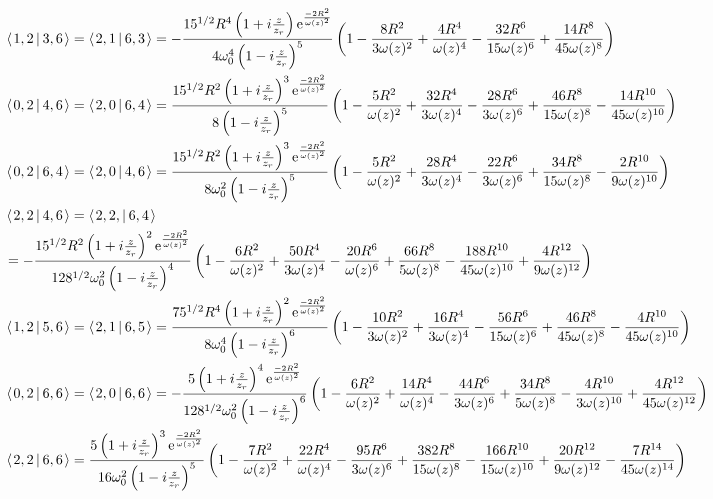 \documentclass[11pt]{amsart}
\makeatletter
\newcommand{\e}{{\rm e}}				%
\newcommand{\msp}[1]{\mspace{#1mu}}		%
\newcommand{\0}{\varnothing}		%
\newcommand{\brac}[2]{\left\langle\msp{2} #1\left\lvert \msp{3.5} #2 \right.\right\rangle}	%
\newcommand{\1}{!}
\newcommand{\2}{@}
\newcommand{\3}{\#}
\newcommand{\4}{\$}
\newcommand{\5}{\%}
\newcommand{\6}{$^\wedge$}
\newcommand{\7}{\&}
\newcommand{\8}{*}
\newcommand{\9}{(}
\makeatother
\begin{document}
\begin{align*}
&
\brac{1,2}{3,6}=\brac{2,1}{6,3} = -\frac{15^{1/2}R^4\left(1+i\frac{z}{z_r}\right)\e^{\frac{-2R^2}{\omega(z)^2}}}{4\omega_0^4\left(1-i\frac{z}{z_r}\right)^5}\left(1-\frac{8R^2}{3\omega(z)^2}+\frac{4R^4}{\omega(z)^4}-\frac{32R^6}{15\omega(z)^6}+\frac{14R^8}{45\omega(z)^8}\right)
\\
&
\brac{0,2}{4,6}=\brac{2,0}{6,4} = \frac{15^{1/2}R^2\left(1+i\frac{z}{z_r}\right)^3\e^{\frac{-2R^2}{\omega(z)^2}}}{8\left(1-i\frac{z}{z_r}\right)^5}\left(1-\frac{5R^2}{\omega(z)^2}+\frac{32R^4}{3\omega(z)^4}-\frac{28R^6}{3\omega(z)^6}+\frac{46R^8}{15\omega(z)^8}-\frac{14R^{10}}{45\omega(z)^{10}}\right)
\\
&
\brac{0,2}{6,4} = \brac{2,0}{4,6} = \frac{15^{1/2}R^2\left(1+i\frac{z}{z_r}\right)^3\e^{\frac{-2R^2}{\omega(z)^2}}}{8\omega_0^2\left(1-i\frac{z}{z_r}\right)^5}\left(1-\frac{5R^2}{\omega(z)^2}+\frac{28R^4}{3\omega(z)^4}-\frac{22R^6}{3\omega(z)^6}+\frac{34R^8}{15\omega(z)^8}-\frac{2R^{10}}{9\omega(z)^{10}}\right)
\\
&
\brac{2,2}{4,6} = \brac{2,2,}{6,4} 
\\
&
= -\frac{15^{1/2}R^2\left(1+i\frac{z}{z_r}\right)^2\e^{\frac{-2R^2}{\omega(z)^2}}}{128^{1/2}\omega_0^2\left(1-i\frac{z}{z_r}\right)^4}\left(1-\frac{6R^2}{\omega(z)^2}+\frac{50R^4}{3\omega(z)^4}-\frac{20R^6}{\omega(z)^6}+\frac{66R^8}{5\omega(z)^8}-\frac{188R^{10}}{45\omega(z)^{10}}+\frac{4R^{12}}{9\omega(z)^{12}}\right)
\\
&
\brac{1,2}{5,6}=\brac{2,1}{6,5}=\frac{75^{1/2}R^4\left(1+i\frac{z}{z_r}\right)^2\e^{\frac{-2R^2}{\omega(z)^2}}}{8\omega_0^4\left(1-i\frac{z}{z_r}\right)^6}\left(1-\frac{10R^2}{3\omega(z)^2}+\frac{16R^4}{3\omega(z)^4}-\frac{56R^6}{15\omega(z)^6}+\frac{46R^8}{45\omega(z)^8}-\frac{4R^{10}}{45\omega(z)^{10}}\right)
\\
&
\brac{0,2}{6,6} = \brac{2,0}{6,6} =-\frac{5\left(1+i\frac{z}{z_r}\right)^4\e^{\frac{-2R^2}{\omega(z)^2}}}{128^{1/2}\omega_0^2\left(1-i\frac{z}{z_r}\right)^6}\left(1-\frac{6R^2}{\omega(z)^2}+\frac{14R^4}{\omega(z)^4}-\frac{44R^6}{3\omega(z)^6}+\frac{34R^8}{5\omega(z)^8}-\frac{4R^{10}}{3\omega(z)^{10}}+\frac{4R^{12}}{45\omega(z)^{12}}\right)
\\
&\brac{2,2}{6,6} =\frac{5\left(1+i\frac{z}{z_r}\right)^3\e^{\frac{-2R^2}{\omega(z)^2}}}{16\omega_0^2\left(1-i\frac{z}{z_r}\right)^5}\left(1-\frac{7R^2}{\omega(z)^2}+\frac{22R^4}{\omega(z)^4}-\frac{95R^6}{3\omega(z)^6}+\frac{382R^8}{15\omega(z)^8}-\frac{166R^{10}}{15\omega(z)^{10}}+\frac{20R^{12}}{9\omega(z)^{12}}-\frac{7R^{14}}{45\omega(z)^{14}}\right)

\end{align*}
\end{document}
